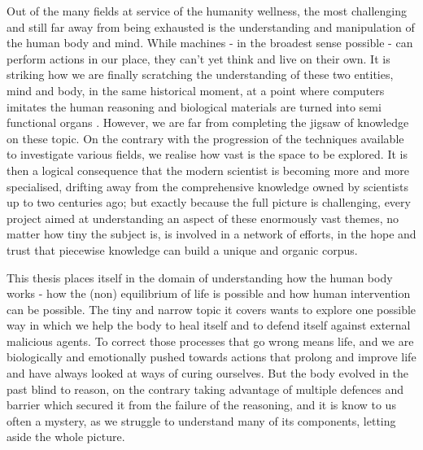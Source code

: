 Out of the many fields at service of the humanity wellness, the most challenging and still far away from being exhausted is the understanding and manipulation of the human body and mind. While machines - in the broadest sense possible - can perform actions in our place, they can't yet think and live on their own. It is striking how we are finally scratching the understanding of these two entities, mind and body, in the same historical moment, at a point where computers imitates the human reasoning \cite{AlphaGo, AIreview} and biological materials are turned into semi functional organs \cite{Rossi2018}. However, we are far from completing the jigsaw of knowledge on these topic. On the contrary with the progression of the techniques available to investigate various fields, we realise how vast is the space to be explored. It is then a logical consequence that the modern scientist is becoming more and more specialised, drifting away from the comprehensive knowledge owned by scientists up to two centuries ago; but exactly because the full picture is challenging, every project aimed at understanding an aspect of these enormously vast themes, no matter how tiny the subject is, is involved in a network of efforts, in the hope and trust that piecewise knowledge can build a unique and organic corpus.

This thesis places itself in the domain of understanding how the human body works - how the (non) equilibrium of life is possible and how human intervention can be possible. The tiny and narrow topic it covers wants to explore one possible way in which we help the body to heal itself and to defend itself against external malicious agents. To correct those processes that go wrong means life, and we are biologically and emotionally pushed towards actions that prolong and improve life and have always looked at ways of curing ourselves. But the body evolved in the past blind to reason, on the contrary taking advantage of multiple defences and barrier which secured it from the failure of the reasoning, and it is know to us often a mystery, as we struggle to understand many of its components, letting aside the whole picture.


